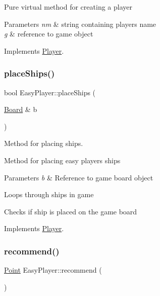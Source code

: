 Pure virtual method for creating a player 
\begin{DoxyParams}{Parameters}
{\em nm} & string containing player\textquotesingle{}s name \\
\hline
{\em g} & reference to game object \\
\hline
\end{DoxyParams}


Implements \mbox{\hyperlink{class_player_a9b9133f3347894da1416953048cecdb2}{Player}}.

\mbox{\label{class_easy_player_a4b9d5815113f393615412f7a98176a6c}} 
\subsubsection{\texorpdfstring{place\+Ships()}{placeShips()}}
{\footnotesize\ttfamily bool Easy\+Player\+::place\+Ships (\begin{DoxyParamCaption}\item[{\mbox{\hyperlink{class_board}{Board}} \&}]{b }\end{DoxyParamCaption})\hspace{0.3cm}{\ttfamily [virtual]}}



Method for placing ships. 

Method for placing easy player\textquotesingle{}s ships 
\begin{DoxyParams}{Parameters}
{\em b} & Reference to game board object \\
\hline
\end{DoxyParams}
Loops through ships in game

Checks if ship is placed on the game board 

Implements \mbox{\hyperlink{class_player_ab89c1180c7314d3e19bcf4b2bed2e02a}{Player}}.

\mbox{\label{class_easy_player_a9b00f4a9acc74ff688c609bc15bdbb4d}} 
\subsubsection{\texorpdfstring{recommend()}{recommend()}}
{\footnotesize\ttfamily \mbox{\hyperlink{class_point}{Point}} Easy\+Player\+::recommend (\begin{DoxyParamCaption}{ }\end{DoxyParamCaption})\hspace{0.3cm}{\ttfamily [virtual]}}




